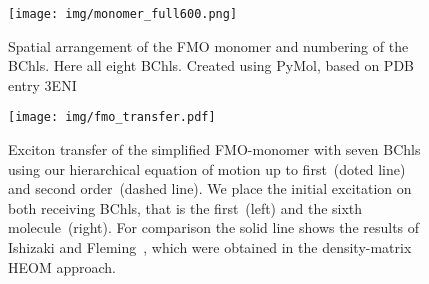 %
%

\begin{figure}[t]
  \centering
  \texttt{[image: img/monomer\_full600.png]}
  \caption{%
    Spatial arrangement of the FMO monomer and numbering of the BChls.
    Here all eight BChls.
    Created using PyMol, based on PDB entry 3ENI \cite{pymol,TrCaBl09_fmo_structure}
  }
  \label{fig:app.monomer_full}
\end{figure}

\begin{figure}[p]
  \centering
  \texttt{[image: img/fmo\_transfer.pdf]}
  \caption{%
    Exciton transfer of the simplified FMO-monomer with seven BChls using our hierarchical equation of motion up to first~(doted line) and second order~(dashed line).
    We place the initial excitation on both receiving BChls, that is the first~(left) and the sixth molecule~(right).
    For comparison the solid line shows the results of Ishizaki and Fleming~\cite{IsFl09_fmo}, which were obtained in the density-matrix HEOM approach.
  }
  \label{fig:app.fmo_transfer_2}
\end{figure}

